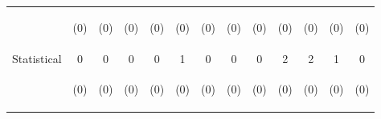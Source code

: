 \begin{tabular}{lcccccccccccc}
 & \begin{footnotesize}(0)\end{footnotesize} & \begin{footnotesize}(0)\end{footnotesize} & \begin{footnotesize}(0)\end{footnotesize} & \begin{footnotesize}(0)\end{footnotesize} & \begin{footnotesize}(0)\end{footnotesize} & \begin{footnotesize}(0)\end{footnotesize} & \begin{footnotesize}(0)\end{footnotesize} & \begin{footnotesize}(0)\end{footnotesize} & \begin{footnotesize}(0)\end{footnotesize} & \begin{footnotesize}(0)\end{footnotesize} & \begin{footnotesize}(0)\end{footnotesize} & \begin{footnotesize}(0)\end{footnotesize}\\
\noalign{\smallskip}Statistical & 0 & 0 & 0 & 0 & 1 & 0 & 0 & 0 & 2 & 2 & 1 & 0\\
 & \begin{footnotesize}(0)\end{footnotesize} & \begin{footnotesize}(0)\end{footnotesize} & \begin{footnotesize}(0)\end{footnotesize} & \begin{footnotesize}(0)\end{footnotesize} & \begin{footnotesize}(0)\end{footnotesize} & \begin{footnotesize}(0)\end{footnotesize} & \begin{footnotesize}(0)\end{footnotesize} & \begin{footnotesize}(0)\end{footnotesize} & \begin{footnotesize}(0)\end{footnotesize} & \begin{footnotesize}(0)\end{footnotesize} & \begin{footnotesize}(0)\end{footnotesize} & \begin{footnotesize}(0)\end{footnotesize}\\

\end{tabular}
